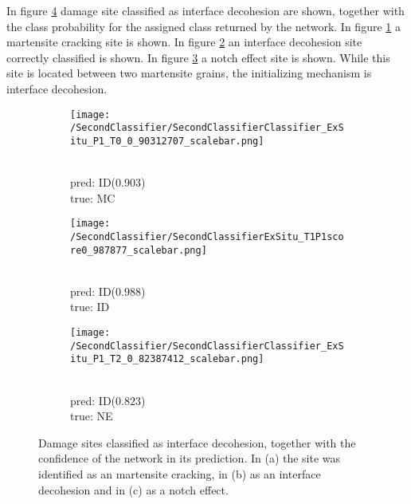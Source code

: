 In figure \ref{fig:ExSituInterfaceDecohesionSamples} damage site classified as interface decohesion are shown, together with the class probability for the assigned class returned by the network. In figure \ref{sub:ExSituInterfaceDecohesionSamplesM} a martensite cracking site is shown. In figure \ref{sub:ExSituInterfaceDecohesionSamplesID} an interface decohesion site correctly classified is shown. In figure \ref{sub:ExSituInterfaceDecohesionSamplesN} a notch effect site is shown. While this site is located between two martensite grains, the initializing mechanism is interface decohesion. 


\begin{figure}[H]
\centering
\begin{subfigure}{0.3\textwidth}
\texttt{[image: /SecondClassifier/SecondClassifierClassifier\_ExSitu\_P1\_T0\_0\_90312707\_scalebar.png]}
\caption{\\pred: ID($0.903$) \\ true: MC}
\label{sub:ExSituInterfaceDecohesionSamplesM}
\end{subfigure}
\begin{subfigure}{0.3\textwidth}
\texttt{[image: /SecondClassifier/SecondClassifierExSitu\_T1P1score0\_987877\_scalebar.png]}
\caption{\\pred: ID($0.988$) \\ true: ID}
\label{sub:ExSituInterfaceDecohesionSamplesID}
\end{subfigure}
\begin{subfigure}{0.3\textwidth}
\texttt{[image: /SecondClassifier/SecondClassifierClassifier\_ExSitu\_P1\_T2\_0\_82387412\_scalebar.png]}
\caption{\\pred: ID($0.823$) \\ true: NE}
\label{sub:ExSituInterfaceDecohesionSamplesN}
\end{subfigure}
\caption{Damage sites classified as interface decohesion, together with the confidence of the network in its prediction. In (a) the site was identified as an martensite cracking, in (b) as an interface decohesion and in (c) as a notch effect. }
\label{fig:ExSituInterfaceDecohesionSamples}
\end{figure}


